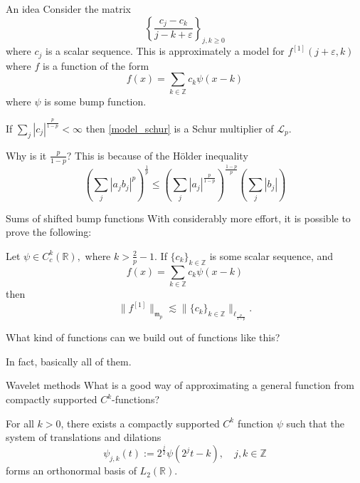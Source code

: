 \documentclass{beamer}
\numberwithin{equation}{section}
\theoremstyle{plain}
\theoremstyle{plain}
\theoremstyle{definition}
\theoremstyle{plain}
\theoremstyle{plain}
\theoremstyle{definition}
\newcommand{\Rl}{\mathbb{R}}
\newcommand{\Itgr}{\mathbb{Z}}
\newcommand{\Lc}{\mathcal{L}}
\newcommand{\mf}{\mathfrak{m}}
\begin{document}
\begin{frame}{An idea}
    Consider the matrix
    \begin{equation}\label{model_schur}
        \left\{\frac{c_j-c_k}{j-k+\varepsilon}\right\}_{j,k\geq 0}
    \end{equation}
    where $c_j$ is a scalar sequence. This is approximately a model for $f^{[1]}(j+\varepsilon,k)$ where $f$ is a function of the form
    \[
        f(x) = \sum_{k\in \Itgr} c_k\psi(x-k)
    \]
    where $\psi$ is some bump function.
    \begin{lemma}
        If $\sum_{j} |c_j|^{\frac{p}{1-p}}<\infty$ then \eqref{model_schur} is a Schur multiplier of $\Lc_p.$
    \end{lemma}
    \pause
    Why is it $\frac{p}{1-p}$? This is because of the H\"older inequality
    \[
        \left(\sum_{j} |a_jb_j|^p\right)^{\frac1p} \leq \left(\sum_{j} |a_j|^{\frac{p}{1-p}}\right)^{\frac{1-p}{p}}\left(\sum_{j} |b_j|\right)
    \]
\end{frame}

\begin{frame}{Sums of shifted bump functions}
    With considerably more effort, it is possible to prove the following:
    \begin{theorem}
        Let $\psi \in C^k_c(\Rl),$ where $k>\frac{2}{p}-1.$ If $\{c_k\}_{k\in \Itgr}$ is some scalar sequence, and
        \[
            f(x) = \sum_{k\in \Itgr} c_k\psi(x-k)
        \]
        then
        \[
            \|f^{[1]}\|_{\mf_p} \lesssim \|\{c_k\}_{k\in \Itgr}\|_{\ell_{\frac{p}{1-p}}}.
        \]
    \end{theorem}
    What kind of functions can we build out of functions like this?\pause

    In fact, basically all of them.
\end{frame}

\begin{frame}{Wavelet methods}
    What is a good way of approximating a general function from compactly supported $C^k$-functions?\pause
    \begin{theorem}[Daubechies (1988)]
        For all $k>0$, there exists a compactly supported $C^k$ function $\psi$ such that the system of translations
        and dilations
        \begin{equation*}
            \psi_{j,k}(t) := 2^{\frac{j}{2}}\psi(2^jt-k),\quad j,k\in \Itgr
        \end{equation*}
        forms an orthonormal basis of $L_2(\Rl).$
    \end{theorem}
\end{frame}
\end{document}
